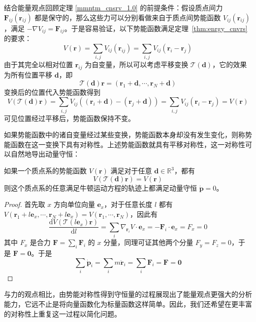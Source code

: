 \documentclass[cn,10pt,math=newtx,citestyle=gb7714-2015,bibstyle=gb7714-2015]{elegantbook}
\def\bm{\boldsymbol}
\def\mc{\mathcal}
\def\d{\mathrm d}
\def\R{\mathbb R}
\begin{document}
结合能量观点回顾定理 \ref{mmntm_cnsrv_1.0} 的前提条件：假设质点间力 $\bm F_{ij}(\bm r_{ij})$ 都是保守的，那么这些力可以分别看做来自于质点间势能函数 $V_{ij}(\bm r_{ij})$，满足 $-\nabla V_{ij}=\bm F_{ij}$。于是容易验证，以下势能函数满足定理~\ref{thm:enrgy_cnvrs} 的要求：
\begin{equation*}
    V(\bm r)=\sum_{i,j}V_{ij}(\bm r_{ij})=\sum_{i,j}V_{ij}(\bm r_i-\bm r_j)
\end{equation*}
由于其完全以相对位置 $\bm r_{ij}$ 为自变量，所以可以考虑平移变换 $\mc T(\bm d)$，它的效果为所有位置平移 $\bm d$，即
\begin{equation*}
    \mc T(\bm d)\bm r=(\bm r_1+\bm d,\cdots,\bm r_N+\bm d)
\end{equation*}
变换后的位置代入势能函数得到
\begin{equation*}
    V(\mc T(\bm d)\bm r) = \sum_{i,j}V_{ij}((\bm r_i+\bm d)-(\bm r_j+\bm d)) = \sum_{i,j}V_{ij}(\bm r_i-\bm r_j) = V(\bm r)
\end{equation*}
可见位置经过平移后，势能函数保持不变。

如果势能函数中的诸自变量经过某些变换，势能函数本身却没有发生变化，则称势能函数在这一变换下具有对称性。上述势能函数就具有平移对称性，这一对称性可以自然地导出动量守恒：
\begin{theorem}[动量守恒定律-v2.0]
    如果一个质点系的势能函数 $V(\bm r)$ 满足对于任意 $\bm d\in\R^3$，都有
    \begin{equation*}
        V(\mc T(\bm d)\bm r)=V(\bm r)
    \end{equation*}
    则这个质点系的任意满足牛顿运动方程的轨迹上都满足动量守恒 $\dot{\bm p}=0$。
\end{theorem}
\begin{proof}
    首先取 $x$ 方向单位向量 $\bm e_x$，对于任意长度 $l$ 都有 $V(\bm r_1+l\bm e_x,\cdots,\bm r_N+l\bm e_x)=V(\bm r_1,\cdots,\bm r_N)$，因此有
    \begin{equation*}
        \frac{\d V(\mc T(l\bm e_x)\bm r)}{\d l}=\sum_{i}\nabla_{\bm r_i}V\cdot\bm e_x=-\bm F_i\cdot\bm e_x=F_x=0
    \end{equation*}
    其中 $F_x$ 是合力 $\bm F=\sum_i\bm F_i$ 的 $x$ 分量，同理可证其他两个分量 $F_y=F_z=0$，于是 $\bm F=\bm 0$。于是
    \begin{equation*}
        \sum_i{\dot{\bm p}_i}=\sum_i{m\ddot{\bm r}_i}=\sum_i\bm F_i=\bm F=\bm 0
    \end{equation*}
\end{proof}

与力的观点相比，由势能对称性得到守恒量的过程展现出了能量观点更强大的分析能力，它远不止是将向量函数化为标量函数这样简单。因此，我们还希望在更丰富的对称性上重复这一过程以简化问题。
\end{document}
